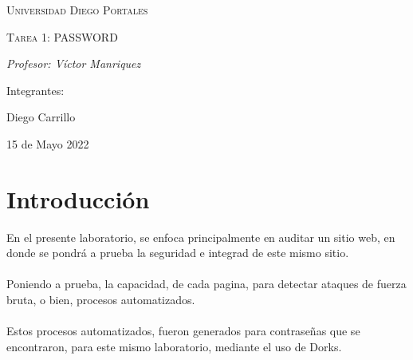 \documentclass[]{article}
\begin{document}
    \begin{titlepage}
        \centering
        \vspace{1cm}
        {\scshape\Large Universidad Diego Portales \par}
        \vspace{2cm}
        {\scshape\Huge Tarea 1: PASSWORD\par}
        \vspace{1cm}
        \vspace{1cm}
        {\itshape\Large Profesor: Víctor Manriquez \par}
        \vfill
        {\Large Integrantes: \par}
        {\Large Diego Carrillo \par}
        \vfill
        {\Large 15 de Mayo 2022 \par}
    \end{titlepage}

\tableofcontents
 \newpage
 \section{Introducción}
 En el presente laboratorio, se enfoca principalmente en auditar un sitio web, en donde se pondrá a prueba la seguridad e integrad de este mismo sitio. 
 \\\\
 Poniendo a prueba, la capacidad, de cada pagina, para detectar ataques de fuerza bruta, o bien, procesos automatizados.
 \\\\
 Estos procesos automatizados, fueron generados para contraseñas que se encontraron, para este mismo laboratorio, mediante el uso de Dorks. 
\end{document}
